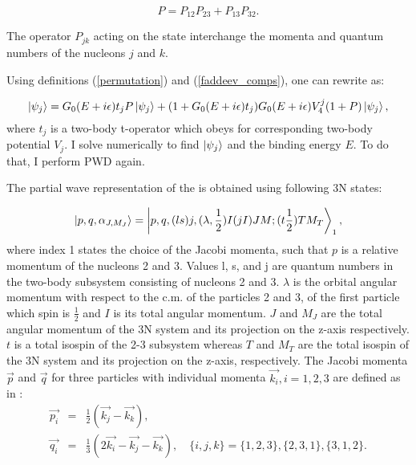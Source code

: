     \begin{equation}
        P = P_{12}P_{23} + P_{13}P_{32}.
        \label{permutation}
    \end{equation}

    The operator $P_{jk}$ acting on the state interchange the momenta and  
    quantum numbers of the nucleons $j$ and $k$.

    Using definitions (\ref{permutation}) and (\ref{faddeev_comps}),
    one can rewrite  as:

    \begin{equation}
        \ket{\psi_j} = G_0(E+i\epsilon)t_j P \ket{\psi_j} + 
        (1 + G_0(E+i\epsilon)t_j)G_0(E+i\epsilon)V_4^j(1+P)\ket{\psi_j},
        \label{fadeed_lse}
    \end{equation}
    where $t_j$ is a two-body t-operator which obeys  for corresponding 
    two-body potential $V_j$. I solve  numerically to find $\ket{\psi_j}$
    and the binding energy $E$. To do that, I perform PWD again.

The partial wave representation of the  is obtained using
following 3N states:

\begin{equation}
    \ket{p,q,\alpha_{J,M_J}} = \ket{p,q,(ls)j, (\lambda, \frac{1}{2})I(jI)JM;(t\frac{1}{2})TM_T}_1,
    \label{3N_PW}
\end{equation}
where index 1 states the choice of the Jacobi momenta, such that $p$ is a relative momentum of the nucleons 2 and 3.
Values l, s, and j are quantum numbers in the two-body subsystem consisting of nucleons 2 and 3. $\lambda$ is the 
orbital angular momentum with respect to the c.m. of the particles 2 and 3,
of the first particle which spin is $\frac{1}{2}$
and $I$ is its total angular momentum.
$J$ and $M_J$ are the total angular momentum of the 3N system and its projection on the z-axis respectively.
$t$ is a total isospin of the 2-3 subsystem whereas $T$ and $M_T$ are the total isospin of the 3N system and its projection on the z-axis, respectively.  
The Jacobi momenta $\vec{p}$ and $\vec{q}$ for three particles with individual momenta $\vec{k_i}, i={1,2,3}$ are defined as in \cite{Glockle1983}:
    \begin{eqnarray}
        \vec{p_i} &=& \frac{1}{2}(\vec{k_j} - \vec{k_k}),\nonumber\\
        \vec{q_i} &=& \frac{1}{3}(2\vec{k_i} - \vec{k_j} - \vec{k_k}), \quad \{i,j,k\}=\{1,2,3\}, \{2,3,1\}, \{3,1,2\}.
    \end{eqnarray}


